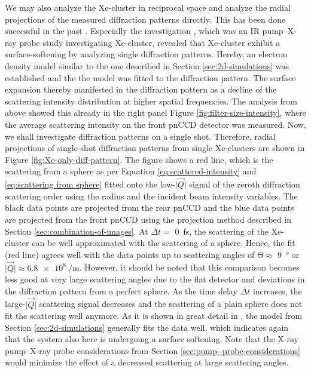 We may also analyze the Xe-cluster in reciprocal space and analyze the radial projections of the measured diffraction patterns directly. This has been done successful in the past \cite{Gorkhover-2016-NatPho,Rupp-2016-Springer,Bostedt-2012-PRL}. Especially the investigation \cite{Gorkhover-2016-NatPho}, which was an IR pump--X-ray probe study investigating Xe-cluster, revealed that Xe-cluster exhibit a surface-softening by analyzing single diffraction patterns. Hereby, an electron density model similar to the one described in Section \ref{sec:2d-simulations} was established and the the model was fitted to the diffraction pattern. The surface expansion thereby manifested in the diffraction pattern as a decline of the scattering intensity distribution at higher spatial frequencies. The analysis from above showed this already in the right panel Figure \ref{fig:filter-size-intensity}, where the average scattering intensity on the front pnCCD detector was measured. Now, we shall investigate diffraction patterns on a single shot. Therefore, radial projections of single-shot diffraction patterns from single Xe-clusters are shown in Figure \ref{fig:Xe-only-diff-pattern}. The figure shows a red line, which is the scattering from a sphere as per Equation \eqref{eq:scattered-intensity} and \eqref{eq:scattering from sphere} fitted onto the low-$\lvert\vec{Q}\rvert$ signal of the zeroth diffraction scattering order using the radius and the incident beam intensity variables. The black data points are projected from the rear pnCCD and the blue data points are projected from the front pnCCD using the projection method described in Section \ref{sec:combination-of-images}. At $\Delta t=$ \SI{0}{\femto\second}, the scattering of the Xe-cluster can be well approximated with the scattering of a sphere. Hence, the fit (red line) agrees well with the data points up to scattering angles of $\Theta \approx$ \SI{9}{\degree} or $\lvert\vec{Q}\rvert\approx\SI{6.8e8}{\per\meter}$. However, it should be noted that this comparison becomes less good at very large scattering angles due to the flat detector \citep{Bostedt-2012-PRL} and deviations in the diffraction pattern from a perfect sphere. As the time delay $\Delta t$ increases, the large-$\lvert\vec{Q}\rvert$ scattering signal decreases and the scattering of a plain sphere does not fit the scattering well anymore. As it is shown in great detail in \citep{Gorkhover-2016-NatPho,Gorkhover-2014-Thesis}, the model from Section \ref{sec:2d-simulations} generally fits the data well, which indicates again that the system also here is undergoing a surface softening. Note that the X-ray pump--X-ray probe considerations from Section \ref{sec:pump--probe-considerations} would minimize the effect of a decreased scattering at large scattering angles.\\[1\baselineskip]

